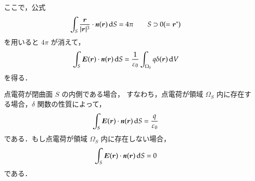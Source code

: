             ここで，公式
                    \begin{align}
                        \int_{S}\frac{\boldsymbol{r}}{|\boldsymbol{r}|^{3}}
                        \cdot\textit{\textbf{n}}(\boldsymbol{r})\,\mathrm{d} S&=4\pi\qquad S\supset 0(=\boldsymbol{r}^{*})
                    \end{align}
            を用いると $4\pi$ が消えて，
                \begin{align}
                    \int_{S}\boldsymbol{E}(\boldsymbol{r})\cdot\textit{\textbf{n}}(\boldsymbol{r})\,\mathrm{d} S
                    &=\frac{1}{\varepsilon_{0}}\int_{\Omega_{S}}q\delta(\boldsymbol{r})\,\mathrm{d} V
                \end{align}
            を得る．

            点電荷が閉曲面 $S$ の内側である場合，
            すなわち，点電荷が領域 $\Omega_{S}$ 内に存在する場合，$\delta$ 関数の性質によって，
                \begin{align}
                    \int_{S}\boldsymbol{E}(\boldsymbol{r})\cdot\textit{\textbf{n}}(\boldsymbol{r})\,\mathrm{d} S
                    &=\frac{q}{\varepsilon_{0}}
                \end{align}
            である．もし点電荷が領域 $\Omega_{S}$ 内に存在しない場合，
                \begin{align}
                    \int_{S}\boldsymbol{E}(\boldsymbol{r})\cdot\textit{\textbf{n}}(\boldsymbol{r})\,\mathrm{d} S
                    &=0
                \end{align}
            である．

